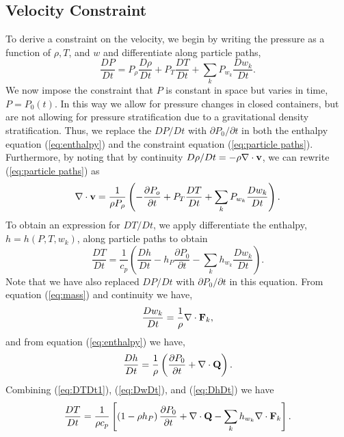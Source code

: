 \documentclass[final]{siamltex}
\def\Fb {{\bf F}}
\def\Qb {{\bf Q}}
\def\vb {{\bf v}}
\begin{document}
\subsection{Velocity Constraint}
To derive a constraint on the velocity, we begin by writing the pressure as a function 
of $\rho, T$, and $w$ and differentiate along particle paths,
\begin{equation}
\frac{DP}{Dt} = P_\rho\frac{D\rho}{Dt} + P_T\frac{DT}{Dt} + \sum_kP_{w_k}\frac{Dw_k}{Dt}.\label{eq:particle paths}
\end{equation}
We now impose the constraint that $P$ is constant in space but varies in time, $P=P_0(t)$.
In this way we allow for pressure changes in closed containers, but are not allowing for 
pressure stratification due to a gravitational density stratification.  Thus, we replace 
the $DP/Dt$ with $\partial P_0/\partial t$ in both the enthalpy equation 
(\ref{eq:enthalpy}) and the constraint equation (\ref{eq:particle paths}).  Furthermore, 
by noting that by continuity $D\rho/Dt = -\rho\nabla\cdot\vb$, we can rewrite 
(\ref{eq:particle paths}) as
\begin{equation}
\nabla\cdot\vb = \frac{1}{\rho P_\rho}\left(-\frac{\partial P_o}{\partial t} + P_T\frac{DT}{Dt} + \sum_kP_{w_k}\frac{Dw_k}{Dt}\right).\label{eq:constraint1}
\end{equation}
To obtain an expression for $DT/Dt$, we apply differentiate the enthalpy, $h=h(P,T,w_k)$, 
along particle paths to obtain
\begin{equation}
\frac{DT}{Dt} = \frac{1}{c_p}\left(\frac{Dh}{Dt} - h_P\frac{\partial P_0}{\partial t} - \sum_kh_{w_k}\frac{Dw_k}{Dt}\right).\label{eq:DTDt1}
\end{equation}
Note that we have also replaced $DP/Dt$ with 
$\partial P_0/\partial t$ in this equation.  From equation (\ref{eq:mass}) and 
continuity we have,
\begin{equation}
\frac{Dw_k}{Dt} = \frac{1}{\rho}\nabla\cdot\Fb_k,\label{eq:DwDt}
\end{equation}
and from equation (\ref{eq:enthalpy}) we have,
\begin{equation}
\frac{Dh}{Dt} = \frac{1}{\rho}\left(\frac{\partial P_0}{\partial t} + \nabla\cdot\Qb\right).\label{eq:DhDt}
\end{equation}
Combining (\ref{eq:DTDt1}), (\ref{eq:DwDt}), and (\ref{eq:DhDt}) we have
\begin{equation}
\frac{DT}{Dt} = \frac{1}{\rho c_p}\left[\left(1 - \rho h_P\right)\frac{\partial P_0}{\partial t} + \nabla\cdot\Qb - \sum_kh_{w_k}\nabla\cdot\Fb_k\right].\label{eq:DTDt}
\end{equation}
\end{document}
